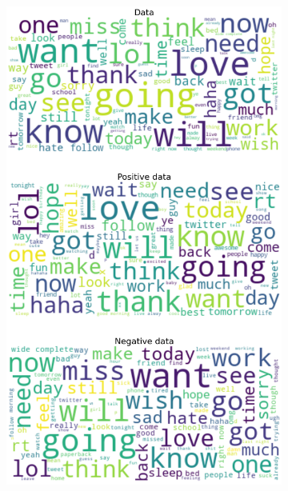 \documentclass{article}
\begin{document}
\begin{itemize}
\begin{figure}[H]
\begin{subfigure}[b]{0.24\textwidth}
\includegraphics[width=\textwidth]{chapter-06/section-01-01/17/visualization/2/wordcloud.png}
\end{subfigure}
\begin{subfigure}[b]{0.24\textwidth}
\centering

\end{subfigure}
\end{figure}
\end{itemize}
\end{document}

